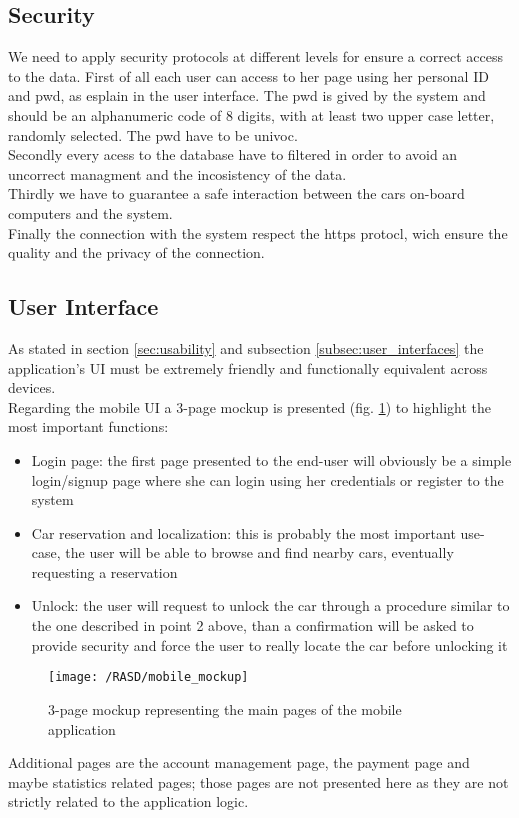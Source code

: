 \subsection{Security}
We need to apply security protocols at different levels for ensure a correct access to the data. First of all each user can access to her page using her personal \gls{ID} and \gls{pwd}, as esplain in the user interface. The \gls{pwd} is gived by the system and should be an alphanumeric code of 8 digits, with at least two upper case letter, randomly selected. The \gls{pwd} have to be univoc. %
\\Secondly every acess to the database have to filtered in order to avoid an uncorrect managment and the incosistency of the data.
\\Thirdly we have to guarantee a safe interaction between the cars on-board computers and the system. 
\\Finally the connection with the system respect the https protocl, wich ensure the quality and the privacy of the connection.

\subsection{User Interface}
As stated in section \ref{sec:usability} and subsection \ref{subsec:user_interfaces} the application's UI must be extremely friendly and functionally equivalent across devices. 
\\Regarding the mobile UI a 3-page mockup is presented (fig. \ref{fig:mobile_mockup}) to highlight the most important functions: 
\begin{itemize}
	\item{Login page: the first page presented to the end-user will obviously be a simple login/signup page where she can login using her credentials or register to the system}
	\item{Car reservation and localization: this is probably the most important use-case, the user will be able to browse and find nearby cars, eventually requesting a reservation}
	\item{Unlock: the user will request to unlock the car through a procedure similar to the one described in point 2 above, than a confirmation will be asked to provide security and force the user to really locate the car before unlocking it}
\end{itemize}
\begin{figure}[!ht]
	\centering
	\vspace{0.2cm}
	\texttt{[image: /RASD/mobile\_mockup]}\\ 
	\vspace{0.5cm}
	\caption{3-page mockup representing the main pages of the mobile application} \label{fig:mobile_mockup} 
\end{figure}
Additional pages are the account management page, the payment page and maybe statistics related pages; those pages are not presented here as they are not strictly related to the application logic.

